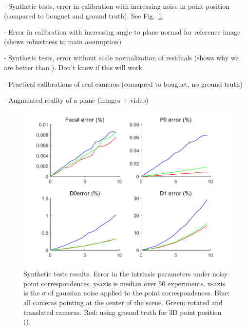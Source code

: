 \documentclass[10pt,twocolumn,letterpaper]{article}
\begin{document}
- Synthetic tests, error in calibration with increasing noise in point position (compared to bouguet and ground truth). See Fig.~\ref{fig:synth_results}.

- Error in calibration with increasing angle to plane normal for reference image (shows robustness to main assumption)

- Synthetic tests, error without scale normalization of residuals (shows why we are better than \cite{bocquillon2006}). Don't know if this will work.

- Practical calibrations of real cameras (comapred to bouguet, no ground truth)

- Augmented reality of a plane (images + video)

\begin{figure}
\centering
\includegraphics[width=\linewidth]{images/resultsPointNoise.pdf}
\caption{Synthetic tests results. Error in the intrinsic parameters under noisy point correspondences. y-axis is median over 50 experiments. x-axis is the $\sigma$ of gaussian noise applied to the point correspondences. Blue: all cameras pointing at the center of the scene. Green: rotated and translated cameras. Red: using ground truth for 3D point position (\cite{zhang1999}).}
\label{fig:synth_results}
\end{figure}
\end{document}
